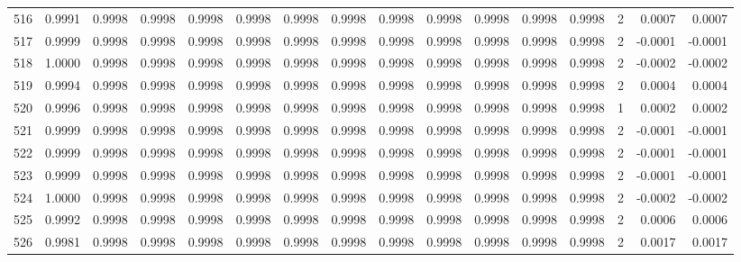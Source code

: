 \begin{tabular}{lrrrrrrrrrrrrrrr}
516 &      0.9991 &  0.9998 &  0.9998 &  0.9998 &  0.9998 &  0.9998 &  0.9998 &  0.9998 &  0.9998 &  0.9998 &   0.9998 &     0.9998 &      2 &                    0.0007 &                     0.0007 \\
517 &      0.9999 &  0.9998 &  0.9998 &  0.9998 &  0.9998 &  0.9998 &  0.9998 &  0.9998 &  0.9998 &  0.9998 &   0.9998 &     0.9998 &      2 &                   -0.0001 &                    -0.0001 \\
518 &      1.0000 &  0.9998 &  0.9998 &  0.9998 &  0.9998 &  0.9998 &  0.9998 &  0.9998 &  0.9998 &  0.9998 &   0.9998 &     0.9998 &      2 &                   -0.0002 &                    -0.0002 \\
519 &      0.9994 &  0.9998 &  0.9998 &  0.9998 &  0.9998 &  0.9998 &  0.9998 &  0.9998 &  0.9998 &  0.9998 &   0.9998 &     0.9998 &      2 &                    0.0004 &                     0.0004 \\
520 &      0.9996 &  0.9998 &  0.9998 &  0.9998 &  0.9998 &  0.9998 &  0.9998 &  0.9998 &  0.9998 &  0.9998 &   0.9998 &     0.9998 &      1 &                    0.0002 &                     0.0002 \\
521 &      0.9999 &  0.9998 &  0.9998 &  0.9998 &  0.9998 &  0.9998 &  0.9998 &  0.9998 &  0.9998 &  0.9998 &   0.9998 &     0.9998 &      2 &                   -0.0001 &                    -0.0001 \\
522 &      0.9999 &  0.9998 &  0.9998 &  0.9998 &  0.9998 &  0.9998 &  0.9998 &  0.9998 &  0.9998 &  0.9998 &   0.9998 &     0.9998 &      2 &                   -0.0001 &                    -0.0001 \\
523 &      0.9999 &  0.9998 &  0.9998 &  0.9998 &  0.9998 &  0.9998 &  0.9998 &  0.9998 &  0.9998 &  0.9998 &   0.9998 &     0.9998 &      2 &                   -0.0001 &                    -0.0001 \\
524 &      1.0000 &  0.9998 &  0.9998 &  0.9998 &  0.9998 &  0.9998 &  0.9998 &  0.9998 &  0.9998 &  0.9998 &   0.9998 &     0.9998 &      2 &                   -0.0002 &                    -0.0002 \\
525 &      0.9992 &  0.9998 &  0.9998 &  0.9998 &  0.9998 &  0.9998 &  0.9998 &  0.9998 &  0.9998 &  0.9998 &   0.9998 &     0.9998 &      2 &                    0.0006 &                     0.0006 \\
526 &      0.9981 &  0.9998 &  0.9998 &  0.9998 &  0.9998 &  0.9998 &  0.9998 &  0.9998 &  0.9998 &  0.9998 &   0.9998 &     0.9998 &      2 &                    0.0017 &                     0.0017 \\

\end{tabular}
